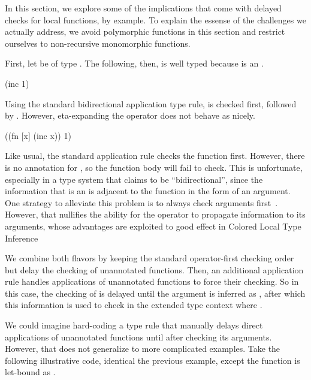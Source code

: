 In this section, we explore some of the implications that come with delayed checks for local functions,
by example.
To explain the essense of the challenges we actually address, we avoid polymorphic functions in this section
and restrict ourselves to non-recursive monomorphic functions.

First, let  be of type .
The following, then, is well typed because  is an .

\begin{cljlisting}
(inc 1)
\end{cljlisting}

Using the standard bidirectional application type rule,  is checked first,
followed by .
However, eta-expanding the operator does not behave as nicely.

\begin{cljlisting}
((fn [x] (inc x)) 1)
\end{cljlisting}

Like usual, the standard application rule checks the function first.
However, there is no annotation for , so the function body will fail
to check.
This is unfortunate, especially in a type system that claims to be ``bidirectional'',
since the information that  is an  is adjacent to the function
in the form of an argument.
One strategy to alleviate this problem is to always check arguments first~\cite{xie2018let}.
However, that nullifies the ability for the operator to propagate information
to its arguments, whose advantages are exploited to good effect in Colored Local Type Inference~\cite{coloredlti01}

We combine both flavors by keeping the standard operator-first checking order
but delay the checking of unannotated functions.
Then, an additional application rule handles applications of
unannotated functions to force their checking.
So in this case, the checking of 
is delayed until the argument  is inferred as ,
after which this information is used to check 
in the extended type context where .

We could imagine hard-coding a type rule that manually delays
direct applications of unannotated functions until after checking
its arguments.
However, that does not generalize to more complicated examples.
Take the following illustrative code, identical the previous
example, except the function is let-bound as .

